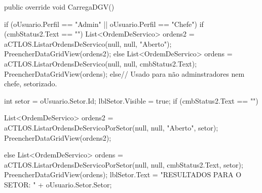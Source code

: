        public override void CarregaDGV()
       {
           if (oUsuario.Perfil == "Admin" || oUsuario.Perfil == "Chefe")
           {
               if (cmbStatus2.Text == "")
               {
                   List<OrdemDeServico> ordens2 = aCTLOS.ListarOrdensDeServico(null, null, "Aberto");
                   PreencherDataGridView(ordens2);
               }
               else
               {
                   List<OrdemDeServico> ordens = aCTLOS.ListarOrdensDeServico(null, null, cmbStatus2.Text);
                   PreencherDataGridView(ordens);
               }
           }
           else// Usado para não adminstradores nem chefe, setorizado.
           {
               int setor = oUsuario.Setor.Id;
               lblSetor.Visible = true;
               if (cmbStatus2.Text == "")
               {
                   List<OrdemDeServico> ordens2 = aCTLOS.ListarOrdensDeServicoPorSetor(null, null, "Aberto", setor);
                   PreencherDataGridView(ordens2);

               }
               else
               {
                   List<OrdemDeServico> ordens = aCTLOS.ListarOrdensDeServicoPorSetor(null, null, cmbStatus2.Text, setor);
                   PreencherDataGridView(ordens);
               }
               lblSetor.Text = "RESULTADOS PARA O SETOR: " + oUsuario.Setor.Setor;
           }

       }